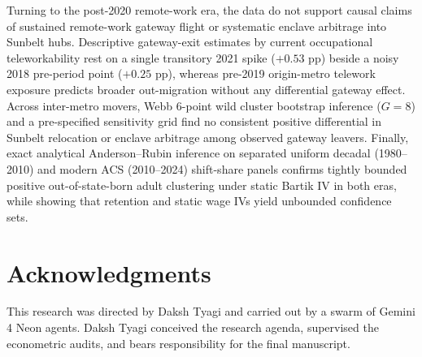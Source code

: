 \documentclass[11pt]{article}
\begin{document}
Turning to the post-2020 remote-work era, the data do not support causal claims of sustained remote-work gateway flight or systematic enclave arbitrage into Sunbelt hubs. Descriptive gateway-exit estimates by current occupational teleworkability rest on a single transitory 2021 spike ($+0.53$ pp) beside a noisy 2018 pre-period point ($+0.25$ pp), whereas pre-2019 origin-metro telework exposure predicts broader out-migration without any differential gateway effect. Across inter-metro movers, Webb 6-point wild cluster bootstrap inference ($G = 8$) and a pre-specified sensitivity grid find no consistent positive differential in Sunbelt relocation or enclave arbitrage among observed gateway leavers. Finally, exact analytical Anderson--Rubin inference on separated uniform decadal (1980--2010) and modern ACS (2010--2024) shift-share panels confirms tightly bounded positive out-of-state-born adult clustering under static Bartik IV in both eras, while showing that retention and static wage IVs yield unbounded confidence sets.

\section*{Acknowledgments}
This research was directed by Daksh Tyagi and carried out by a swarm of Gemini 4 Neon agents. Daksh Tyagi conceived the research agenda, supervised the econometric audits, and bears responsibility for the final manuscript.
\end{document}
